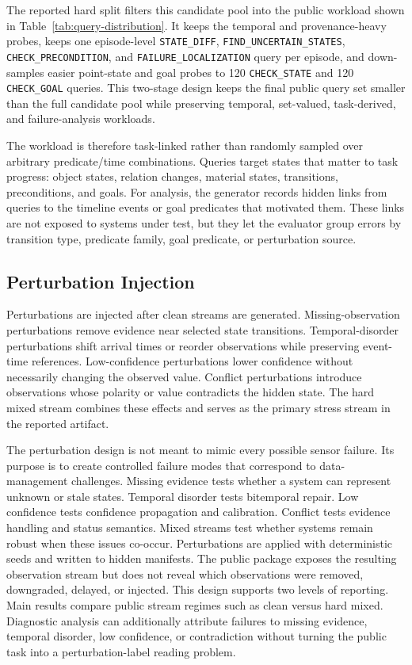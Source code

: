 The reported hard split filters this candidate pool into the public workload shown in Table~\ref{tab:query-distribution}. It keeps the temporal and provenance-heavy probes, keeps one episode-level \texttt{STATE\_DIFF}, \texttt{FIND\_UNCERTAIN\_STATES}, \texttt{CHECK\_PRECONDITION}, and \texttt{FAILURE\_LOCALIZATION} query per episode, and down-samples easier point-state and goal probes to 120 \texttt{CHECK\_STATE} and 120 \texttt{CHECK\_GOAL} queries. This two-stage design keeps the final public query set smaller than the full candidate pool while preserving temporal, set-valued, task-derived, and failure-analysis workloads.

The workload is therefore task-linked rather than randomly sampled over arbitrary predicate/time combinations. Queries target states that matter to task progress: object states, relation changes, material states, transitions, preconditions, and goals. For analysis, the generator records hidden links from queries to the timeline events or goal predicates that motivated them. These links are not exposed to systems under test, but they let the evaluator group errors by transition type, predicate family, goal predicate, or perturbation source.

\subsection{Perturbation Injection}

Perturbations are injected after clean streams are generated. Missing-observation perturbations remove evidence near selected state transitions. Temporal-disorder perturbations shift arrival times or reorder observations while preserving event-time references. Low-confidence perturbations lower confidence without necessarily changing the observed value. Conflict perturbations introduce observations whose polarity or value contradicts the hidden state. The hard mixed stream combines these effects and serves as the primary stress stream in the reported artifact.

The perturbation design is not meant to mimic every possible sensor failure. Its purpose is to create controlled failure modes that correspond to data-management challenges. Missing evidence tests whether a system can represent unknown or stale states. Temporal disorder tests bitemporal repair. Low confidence tests confidence propagation and calibration. Conflict tests evidence handling and status semantics. Mixed streams test whether systems remain robust when these issues co-occur.
Perturbations are applied with deterministic seeds and written to hidden manifests. The public package exposes the resulting observation stream but does not reveal which observations were removed, downgraded, delayed, or injected. This design supports two levels of reporting. Main results compare public stream regimes such as clean versus hard mixed. Diagnostic analysis can additionally attribute failures to missing evidence, temporal disorder, low confidence, or contradiction without turning the public task into a perturbation-label reading problem.

